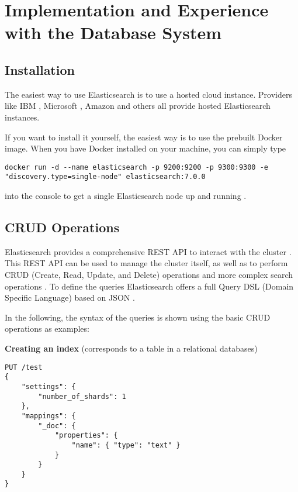 \chapter{Implementation and Experience with the Database System}

\section{Installation}
The easiest way to use Elasticsearch is to use a hosted cloud instance. Providers like IBM \autocite{ibm}, Microsoft \autocite{microsoft}, Amazon \autocite{amazon} and others all provide hosted Elasticsearch instances.

If you want to install it yourself, the easiest way is to use the prebuilt Docker image. When you have Docker installed on your machine, you can simply type
\begin{minipage}[c]{0.95\textwidth}
    \begin{lstlisting}
docker run -d --name elasticsearch -p 9200:9200 -p 9300:9300 -e "discovery.type=single-node" elasticsearch:7.0.0
    \end{lstlisting}
\end{minipage}

into the console to get a single Elasticsearch node up and running \autocite{dockerhub}.

\section{CRUD Operations}
Elasticsearch provides a comprehensive REST API to interact with the cluster \autocite{elastic2019_08}. This REST API can be used to manage the cluster itself, as well as to perform CRUD (Create, Read, Update, and Delete) operations and more complex search operations \autocite{elastic2019_08}. To define the queries Elasticsearch offers a full Query DSL (Domain Specific Language) based on JSON \autocite{elastic2019_08}.

In the following, the syntax of the queries is shown using the basic CRUD operations as examples:

\begin{minipage}[c]{0.95\textwidth}
    \textbf{Creating an index}
    (corresponds to a table in a relational databases)
    \begin{lstlisting}
PUT /test
{
    "settings": {
        "number_of_shards": 1
    },
    "mappings": {
        "_doc": {
            "properties": {
                "name": { "type": "text" }
            }
        }
    }
}
    \end{lstlisting}
\end{minipage}

